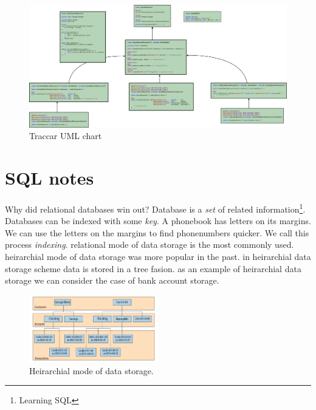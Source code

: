 \documentclass[a4paper]{article}
\begin{document}
\begin{figure}
    \centering
    \includegraphics[width=\textheight]{graphics/uml-chart.png}
    \caption{Traccar UML chart}
\end{figure}

\section*{SQL notes}

\lstset{style=custom-sql}

Why did relational databases win out? Database is a \emph{set} of related information\footnote{Learning SQL}. Databases can
be indexed with some \emph{key}. A phonebook has letters on its margins. We can use the letters on the margins to find
phonenumbers quicker. We call this process \emph{indexing}. relational mode of data storage is the most commonly used.
heirarchial mode of data storage was more popular in the past. in heirarchial data storage scheme data is stored in a tree 
fasion. as an example of heirarchial data storage we can consider the case of bank account storage.

\begin{figure}[hbt!]
    \centering
    \includegraphics[width=0.5\textwidth]{graphics/heirarchial-database.png}
    \caption{Heirarchial mode of data storage.}
\end{figure}
\end{document}

